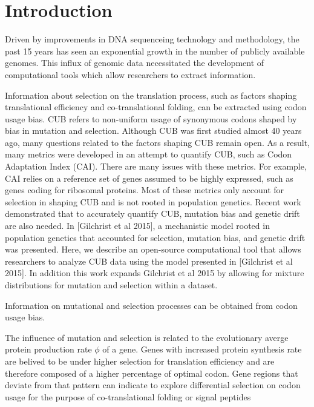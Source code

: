 \documentclass[12pt,draft]{article}
\begin{document}
\section*{Introduction}
Driven by improvements in DNA sequenceing technology and methodology, the past 15 years has seen an exponential growth in the number of publicly available genomes. 
This influx of genomic data necessitated the development of computational tools which allow researchers to extract information.

Information about selection on the translation process, such as factors shaping translational efficiency and co-translational folding, can be extracted using codon usage bias.
CUB refers to non-uniform usage of synonymous codons shaped by bias in mutation and selection.
Although CUB was first studied almost 40 years ago, many questions related to the factors shaping CUB remain open.
As a result, many metrics were developed in an attempt to quantify CUB, such as Codon Adaptation Index (CAI).
There are many issues with these metrics.
For example, CAI relies on a reference set of genes assumed to be highly expressed, such as genes coding for ribosomal proteins.
Most of these metrics only account for selection in shaping CUB and is not rooted in population genetics. 
Recent work demonstrated that to accurately quantify CUB, mutation bias and genetic drift are also needed.
In [Gilchrist et al 2015], a mechanistic model rooted in population genetics that accounted for selection, mutation bias, and genetic drift was presented. 
Here, we describe an open-source computational tool that allows researchers to analyze CUB data using the model presented in [Gilchrist et al 2015].
In addition this work expands Gilchrist et al 2015 by allowing for mixture distributions for mutation and selection within a dataset.




Information on mutational and selection processes can be obtained from codon usage bias.
 
The influence of mutation and selection is related to the evolutionary averge protein production rate $\phi$ of a gene.
Genes with increased protein synthesis rate are belived to be under higher selection for translation efficiency and are therefore composed of a higher percentage of optimal codon.
Gene regions that deviate from that pattern can indicate to explore differential selection on codon usage for the purpose of co-translational folding or signal peptides
\end{document}
